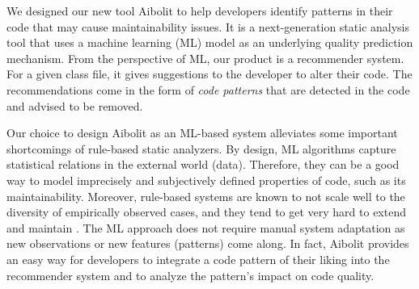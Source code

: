 We designed our new tool Aibolit to help developers identify patterns in their
code that may cause maintainability issues. It is a next-generation static
analysis tool that uses a machine learning (ML) model as an underlying quality
prediction mechanism. From the perspective of ML, our product is a recommender
system. For a given class file, it gives suggestions to the developer to alter
their code. The recommendations come in the form of \textit{code patterns} that
are detected in the code and advised to be removed.

Our choice to design Aibolit as an ML-based system alleviates some important
shortcomings of rule-based static analyzers. By design, ML algorithms capture
statistical relations in the external world (data). Therefore, they can be a
good way to model imprecisely and subjectively defined properties of code, such
as its maintainability. Moreover, rule-based systems are known to not scale well
to the diversity of empirically observed cases, and they tend to get very hard
to extend and maintain \citep{LenatFeigenbaum1987}. The ML
approach does not require
manual system adaptation as new observations or new features (patterns) come
along. In fact, Aibolit provides an easy way for developers to integrate a code
pattern of their liking into the recommender system and to analyze the pattern's
impact on code quality.






